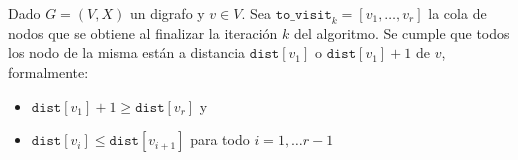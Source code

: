 \begin{lema}
  Dado \(G=(V,X)\) un digrafo y \(v\in V\). Sea \(\texttt{to\_visit}_k=[v_1,\dots,v_r]\) la cola de nodos que se obtiene al finalizar la iteración \(k\) del algoritmo. Se cumple que todos los nodo de la misma están a distancia \(\texttt{dist}[v_1]\) o \( \texttt{dist}[v_1]+ 1\) de \(v\), formalmente:
  \begin{itemize}
    \begin{algorithmic}
      \State $\mathtt{pred[w] =}$ \texttt{antecesor de w en un camino minimo desde v}
      \State $\mathtt{dist[w] =}$ \texttt{distancia desde v a w}

      \State $\mathtt{pred[v]\gets 0}$
      \State $\mathtt{dist[v]\gets 0}$
      \State $\mathtt{to\_visit \gets \{v\}}$
      \State $\mathtt{dist[w] \gets \infty}$
      \EndFor
      \State $\mathtt{x \gets to\_visit.pop()}$
      \State $\mathtt{pred[w] \gets x}$
      \State $\mathtt{dist[w] \gets dist[x] + 1}$
      \State $\mathtt{to\_visite.push(w)}$
      \EndFor
      \EndWhile
      \State\Return \texttt{[pred, dist]}
      \EndProcedure
    \end{algorithmic}

    \item \(\texttt{dist}[v_1] + 1 \geq \texttt{dist}[v_r]\) y
    \item \(\texttt{dist}[v_i] \leq \texttt{dist}[v_{i+1}]\) para todo \(i = 1,\dots r-1\)
  \end{itemize}
\end{lema}
